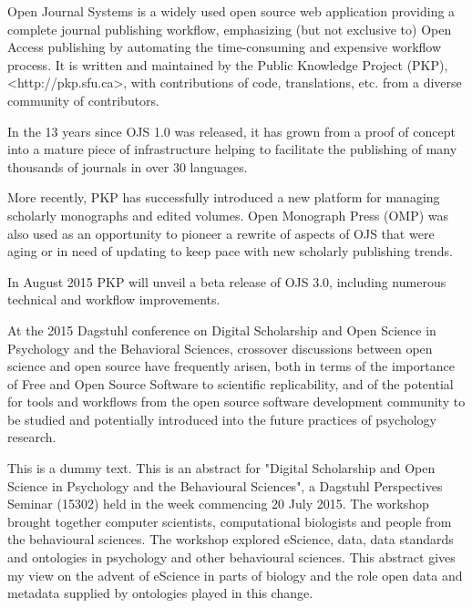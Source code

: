 \documentclass[a4paper,UKenglish]{dagrep}
\begin{document}
{}
\license
Open Journal Systems is a widely used open source web application providing a
complete journal publishing workflow, emphasizing (but not exclusive to) Open
Access publishing by automating the time-consuming and expensive workflow
process. It is written and maintained by the Public Knowledge Project (PKP),
<http://pkp.sfu.ca>, with contributions of code, translations, etc. from a
diverse community of contributors.

In the 13 years since OJS 1.0 was released, it has grown from a proof of concept
into a mature piece of infrastructure helping to facilitate the publishing of
many thousands of journals in over 30 languages.

More recently, PKP has successfully introduced a new platform for managing
scholarly monographs and edited volumes. Open Monograph Press (OMP) was also
used as an opportunity to pioneer a rewrite of aspects of OJS that were aging or
in need of updating to keep pace with new scholarly publishing trends.

In August 2015 PKP will unveil a beta release of OJS 3.0, including numerous
technical and workflow improvements.

At the 2015 Dagstuhl conference on Digital Scholarship and Open Science in
Psychology and the Behavioral Sciences, crossover discussions between open
science and open source have frequently arisen, both in terms of the importance
of Free and Open Source Software to scientific replicability, and of the
potential for tools and workflows from the open source software development
community to be studied and potentially introduced into the future practices of
psychology research.




{}
\license
This is a dummy text. 
This is an abstract for "Digital Scholarship and Open Science in Psychology and
the Behavioural Sciences", a Dagstuhl Perspectives Seminar (15302) held in the
week commencing 20 July 2015. The workshop brought together computer scientists,
computational biologists and people from the behavioural sciences. The workshop
explored eScience, data, data standards and ontologies in psychology and other
behavioural sciences. This abstract gives my view on the advent of eScience in
parts of biology and the role open data and metadata supplied by ontologies
played in this change.
\end{document}
